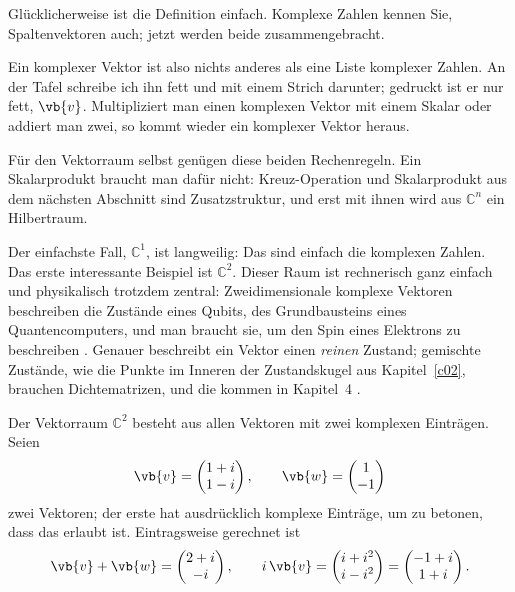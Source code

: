 Glücklicherweise ist die Definition einfach. Komplexe Zahlen kennen Sie, Spaltenvektoren
auch; jetzt werden beide zusammengebracht.


Ein komplexer Vektor ist also nichts anderes als eine Liste komplexer Zahlen. An der Tafel
schreibe ich ihn fett und mit einem Strich darunter; gedruckt ist er nur fett, $\vb{v}$.
Multipliziert man einen komplexen Vektor mit einem Skalar oder addiert man zwei, so kommt
wieder ein komplexer Vektor heraus.

Für den Vektorraum selbst genügen diese beiden Rechenregeln. Ein Skalarprodukt braucht man
dafür nicht: Kreuz-Operation und Skalarprodukt aus dem nächsten Abschnitt sind
Zusatzstruktur, und erst mit ihnen wird aus $\mathbb{C}^n$ ein Hilbertraum.

Der einfachste Fall, $\mathbb{C}^1$, ist langweilig: Das sind einfach die komplexen Zahlen. Das
erste interessante Beispiel ist $\mathbb{C}^2$. Dieser Raum ist rechnerisch ganz einfach und
physikalisch trotzdem zentral: Zweidimensionale komplexe Vektoren beschreiben die Zustände
eines Qubits, des Grundbausteins eines Quantencomputers, und man braucht sie, um den Spin
eines Elektrons zu beschreiben . Genauer
beschreibt ein Vektor einen \emph{reinen} Zustand; gemischte Zustände, wie die Punkte im
Inneren der Zustandskugel aus Kapitel~\ref{c02}, brauchen Dichtematrizen, und die kommen in
Kapitel~4 .

\begin{example}\label{c03.ex.c2}
  Der Vektorraum $\mathbb{C}^2$ besteht aus allen Vektoren mit zwei komplexen Einträgen. Seien
  \begin{equation}\label{c03.eq.c2-vektoren}
    \vb{v} = \begin{pmatrix} 1+i \\ 1-i \end{pmatrix},
    \qquad
    \vb{w} = \begin{pmatrix} 1 \\ -1 \end{pmatrix}
  \end{equation}
  zwei Vektoren; der erste hat ausdrücklich komplexe Einträge, um zu betonen, dass das
  erlaubt ist. Eintragsweise gerechnet ist
  \begin{equation}\label{c03.eq.c2-rechnung}
    \vb{v} + \vb{w} = \begin{pmatrix} 2+i \\ -i \end{pmatrix},
    \qquad
    i\,\vb{v} = \begin{pmatrix} i + i^2 \\ i - i^2 \end{pmatrix}
              = \begin{pmatrix} -1+i \\ 1+i \end{pmatrix} .
  \end{equation}
\end{example}


